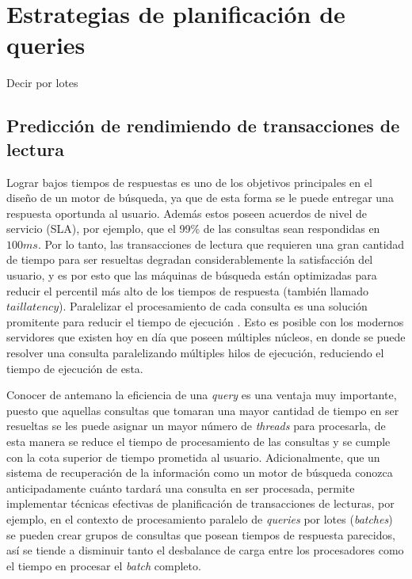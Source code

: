 \chapter{Estrategias de planificación de queries}
\label{cap:epq}

Decir por lotes

\section{Predicción de rendimiendo de transacciones de lectura}
\label{scheduling:prtl}
Lograr bajos tiempos de respuestas es uno de los objetivos principales en el diseño de un motor de búsqueda, ya que de esta forma se le puede entregar una respuesta oportunda al usuario. Además estos poseen acuerdos de nivel de servicio (SLA), por ejemplo, que el 99\% de las consultas sean respondidas en $100 ms$. Por lo tanto, las transacciones de lectura que requieren una gran cantidad de tiempo para ser resueltas degradan considerablemente la satisfacción del usuario, y es por esto que las máquinas de búsqueda están optimizadas para reducir el percentil más alto de los tiempos de respuesta (también llamado $tail latency$). Paralelizar el procesamiento de cada consulta es una solución promitente para reducir el tiempo de ejecución \citep{Jeon:2013, Tatikonda:2011}. Esto es posible con los modernos servidores que existen hoy en día que poseen múltiples núcleos, en donde se puede resolver una consulta paralelizando múltiples hilos de ejecución, reduciendo el tiempo de ejecución de esta.

Conocer de antemano la eficiencia de una \textit{query} es una ventaja muy importante, puesto que aquellas consultas que tomaran una mayor cantidad de tiempo en ser resueltas se les puede asignar un mayor número de \textit{threads} para procesarla, de esta manera se reduce el tiempo de procesamiento de las consultas y se cumple con la cota superior de tiempo prometida al usuario. Adicionalmente, que un sistema de recuperación de la información como un motor de búsqueda conozca anticipadamente cuánto tardará una consulta en ser procesada, permite implementar técnicas efectivas de planificación de transacciones de lecturas, por ejemplo, en el contexto de procesamiento paralelo de \textit{queries} por lotes (\textit{batches}) se pueden crear grupos de consultas que posean tiempos de respuesta parecidos, así se tiende a disminuir tanto el desbalance de carga entre los procesadores como el tiempo en procesar el \textit{batch} completo.

